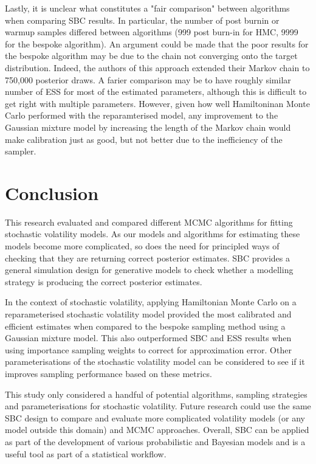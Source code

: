 \documentclass[12pt, a4paper]{article}
\begin{document}
Lastly, it is unclear what constitutes a "fair comparison" between algorithms when comparing SBC results. In particular, the number of post burnin or warmup samples differed between algorithms (999 post burn-in for HMC, 9999 for the bespoke algorithm). An argument could be made that the poor results for the bespoke algorithm may be due to the chain not converging onto the target distribution. Indeed, the authors of this approach extended their Markov chain to 750,000 posterior draws. A farier comparison may be to have roughly similar number of ESS for most of the estimated parameters, although this is difficult to get right with multiple parameters. However, given how well Hamiltoninan Monte Carlo performed with the reparamterised model, any improvement to the Gaussian mixture model by increasing the length of the Markov chain would make calibration just as good, but not better due to the inefficiency of the sampler. 

\section{Conclusion}
This research evaluated and compared different MCMC algorithms for fitting stochastic volatility models. As our models and algorithms for estimating these models become more complicated, so does the need for principled ways of checking that they are returning correct posterior estimates. SBC provides a general simulation design for generative models to check whether a modelling strategy is producing the correct posterior estimates. 

In the context of stochastic volatility, applying Hamiltonian Monte Carlo on a reparameterised stochastic volatility model provided the most calibrated and efficient estimates when compared to the bespoke sampling method using a Gaussian mixture model. This also outperformed SBC and ESS results when using importance sampling weights to correct for approximation error. Other parameterisations of the stochastic volatility model can be considered to see if it improves sampling performance based on these metrics. 

This study only considered a handful of potential algorithms, sampling strategies and parameterisations for stochastic volatility. Future research could use the same SBC design to compare and evaluate more complicated volatility models (or any model outside this domain) and MCMC approaches. Overall, SBC can be applied as part of the development of various probabilistic and Bayesian models and is a useful tool as part of a statistical workflow.
 
\newpage


\end{document}
